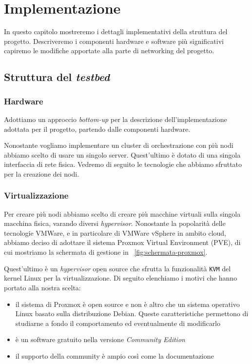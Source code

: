 \documentclass[12pt, hidelinks]{report}
\begin{document}
\chapter{Implementazione}

In questo capitolo mostreremo i dettagli implementativi della struttura del progetto. Descriveremo i componenti hardware e software più significativi capiremo le modifiche apportate alla parte di networking del progetto.

\section{Struttura del \textit{testbed}}

\subsection{Hardware}
Adottiamo un approccio \textit{bottom-up} per la descrizione dell'implementazione adottata per il progetto, partendo dalle componenti hardware. 

Nonostante vogliamo implementare un cluster di orchestrazione con più nodi abbiamo scelto di usare un singolo server. Quest'ultimo è dotato di una singola interfaccia di rete fisica. Vedremo di seguito le tecnologie che abbiamo sfruttato per la creazione dei nodi.

\subsection{Virtualizzazione}
Per creare più nodi abbiamo scelto di creare più macchine virtuali sulla singola macchina fisica, varando diversi \textit{hypervisor}. Nonostante la popolarità delle tecnologie VMWare, e in particolare di VMWare vSphere in ambito cloud, abbiamo deciso di adottare il sistema Proxmox Virtual Environment (PVE), di cui mostriamo la schermata di gestione in \figurename~\ref{fig:schermata-proxmox}. 

Quest'ultimo è un \textit{hypervisor} open source che sfrutta la funzionalità \texttt{KVM} del kernel Linux per la virtualizzazione. Di seguito elenchiamo i motivi che hanno portato alla nostra scelta:

\begin{itemize}
    \item il sistema di Proxmox è open source e non è altro che un sistema operativo Linux basato sulla distribuzione Debian. Queste caratteristiche permettono di studiarne a fondo il comportamento ed eventualmente di modificarlo
    \item è un software gratuito nella versione \textit{Community Edition}
    \item il supporto della community è ampio così come la documentazione
\end{itemize}
\end{document}
